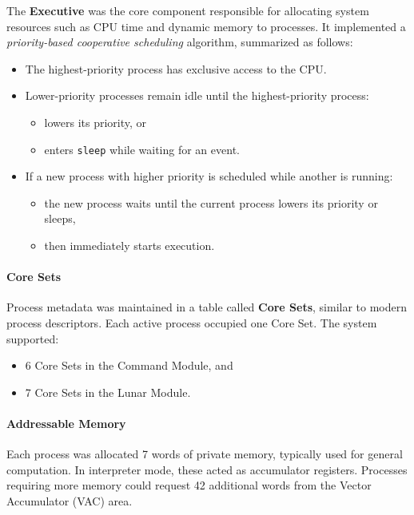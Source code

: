 The \textbf{Executive} was the core component responsible for allocating system
resources such as CPU time and dynamic memory to processes. It implemented a
\emph{priority-based cooperative scheduling} algorithm, summarized as follows:

\begin{emptythm}
    \begin{itemize}[left=8pt]
        \item The highest-priority process has exclusive access to the CPU.
        \item Lower-priority processes remain idle until the highest-priority process:
            \begin{itemize}
                \item lowers its priority, or
                \item enters \texttt{sleep} while waiting for an event.
            \end{itemize}
        \item If a new process with higher priority is scheduled while another is
            running:
            \begin{itemize}
                \item the new process waits until the current process lowers its
                    priority or sleeps,
                \item then immediately starts execution.
            \end{itemize}
    \end{itemize}
\end{emptythm}

\paragraph*{Core Sets} Process metadata was maintained in a table called \textbf{Core
Sets}, similar to modern process descriptors. Each active process occupied one Core
Set. The system supported:
\begin{itemize}
    \item 6 Core Sets in the Command Module, and
    \item 7 Core Sets in the Lunar Module.
\end{itemize}

\paragraph*{Addressable Memory} Each process was allocated 7 words of private memory,
typically used for general computation. In interpreter mode, these acted as accumulator
registers. Processes requiring more memory could request 42 additional words from the
Vector Accumulator (VAC) area.

